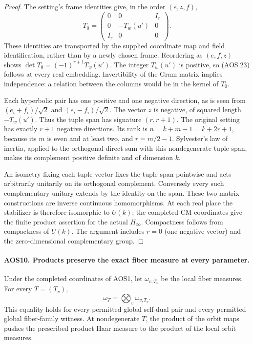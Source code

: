 \begin{proof}
The setting's frame identities give, in the order $(e,z,f)$,
\[
       T_0=\begin{pmatrix}
           0&0&I_r\\0&-T_w(u')&0\\I_r&0&0
          \end{pmatrix}.
 \tag{AOS.24}
\]
These identities are transported by the supplied coordinate map and
field identification, rather than by a newly chosen frame.
Reordering as $(e,f,z)$ shows
$\det T_0=(-1)^{r+1}T_w(u')$.  The integer $T_w(u')$ is positive,
so (AOS.23) follows at every real embedding.  Invertibility of the
Gram matrix implies independence: a relation between the columns
would be in the kernel of $T_0$.

Each hyperbolic pair has one positive and one negative direction,
as is seen from $(e_i+f_i)/\sqrt2$ and $(e_i-f_i)/\sqrt2$.
The vector $z$ is negative, of squared length $-T_w(u')$.
Thus the tuple span has signature $(r,r+1)$.  The original setting
has exactly $r+1$ negative directions.  Its rank is
$n=k+m-1=k+2r+1$, because its $m$ is even and at least two,
and $r=m/2-1$.  Sylvester's law of inertia, applied to the orthogonal
direct sum with this nondegenerate tuple span, makes its complement
positive definite and of dimension $k$.

An isometry fixing each tuple vector fixes the tuple span pointwise
and acts arbitrarily unitarily on its orthogonal complement.
Conversely every such complementary unitary extends by the identity
on the span.  These two matrix constructions are inverse continuous
homomorphisms.  At each real place the stabilizer is therefore
isomorphic to $U(k)$; the completed CM coordinates give the finite
product assertion for the actual $H_\infty$.  Compactness follows
from compactness of $U(k)$.  The argument includes $r=0$ (one
negative vector) and the zero-dimensional complementary group.
\end{proof}

\paragraph{AOS10. Products preserve the exact fiber measure at every parameter.}
\label{claim:AOS10}
Under the completed coordinates of AOS1, let $\omega_{v,T_v}$ be
the local fiber measures.  For every $T=(T_v)$,
\[
                         \omega_T=\bigotimes_v\omega_{v,T_v}.
 \tag{AOS.25}
\]
This equality holds for every permitted global self-dual pair and
every permitted global fiber-family witness.  At nondegenerate $T$,
the product of the orbit maps pushes the prescribed product Haar
measure to the product of the local orbit measures.

